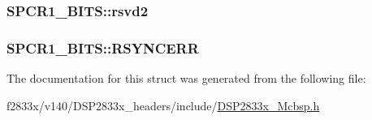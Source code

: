 \subsubsection[{rsvd2}]{ S\+P\+C\+R1\+\_\+\+B\+I\+T\+S\+::rsvd2}\label{struct_s_p_c_r1___b_i_t_s_a12bf10c6bc2a81a31ed9c209b3d2dce1}
\hypertarget{struct_s_p_c_r1___b_i_t_s_ae45db758df8d41708aae57f6997a7fdf}{}
\subsubsection[{R\+S\+Y\+N\+C\+E\+R\+R}]{ S\+P\+C\+R1\+\_\+\+B\+I\+T\+S\+::\+R\+S\+Y\+N\+C\+E\+R\+R}\label{struct_s_p_c_r1___b_i_t_s_ae45db758df8d41708aae57f6997a7fdf}


The documentation for this struct was generated from the following file\+:\begin{DoxyCompactItemize}
\item 
f2833x/v140/\+D\+S\+P2833x\+\_\+headers/include/\hyperlink{_d_s_p2833x___mcbsp_8h}{D\+S\+P2833x\+\_\+\+Mcbsp.\+h}\end{DoxyCompactItemize}
